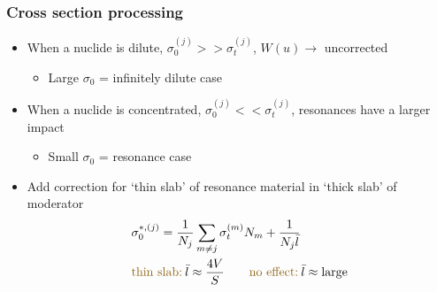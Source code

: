 \documentclass[xcolor=x11names,compress, handout]{beamer}
\renewcommand{\(}{\begin{columns}}
\renewcommand{\)}{\end{columns}}
\newcommand{\<}[1]{\begin{column}{#1}}
\renewcommand{\>}{\end{column}}
\begin{document}
	
\begin{frame}[fragile]
  \frametitle{Cross section processing}

	\begin{itemize}
	\item When a nuclide is dilute, $\sigma_0^{(j)} >>
	 \sigma_t^{(j)}$, $W(u) \rightarrow$ uncorrected 
		\begin{itemize}
		\item Large $\sigma_0$ = infinitely dilute case	
		\end{itemize}

	\item When a nuclide is concentrated, $\sigma_0^{(j)} << 
	 \sigma_t^{(j)}$, resonances have a larger impact 
		\begin{itemize}
		\item Small $\sigma_0$ = resonance case	
		\end{itemize}
	\end{itemize}

    \pause	
	\begin{itemize}
	\item Add correction for `thin slab' of resonance material in 
	`thick slab' of moderator
	\begin{align}
  	&\sigma_0^{*,(j)} = \frac{1}{N_j} \sum_{m \ne j} \sigma_{t}^{(m)} N_m 
	+ \frac{1}{N_j \bar{l}} \nonumber\\
  	&\text{\textcolor{byellow}{thin slab:}}\:\bar{l} \approx \frac{4V}{S} \qquad \text{\textcolor{byellow}{no effect:}}\:\bar{l} \approx \text{large} \nonumber
	\end{align}
	\end{itemize}
  
\end{frame}
\end{document}
